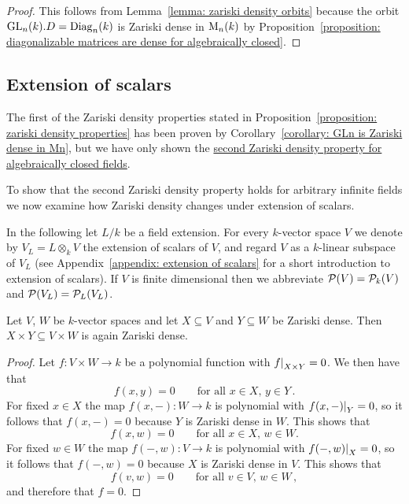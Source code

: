 \begin{proof}
  This follows from Lemma~\ref{lemma: zariski density orbits} because the orbit $\operatorname{GL}_n(k).D = \operatorname{Diag}_n(k)$ is Zariski dense in $\operatorname{M}_n(k)$ by Proposition~\ref{proposition: diagonalizable matrices are dense for algebraically closed}.
\end{proof}





\subsection*{Extension of scalars}


\begin{fluff}
  The first of the Zariski density properties stated in Proposition~\ref{proposition: zariski density properties} has been proven by Corollary~\ref{corollary: GLn is Zariski dense in Mn}, but we have only shown the \hyperref[corollary: second Zariski density property for algebraically closed fields]{second Zariski density property for algebraically closed fields}.
  
  To show that the second Zariski density property holds for arbitrary infinite fields we now examine how Zariski density changes under extension of scalars.
\end{fluff}


\begin{conventions}
  In the following let $L/k$ be a field extension.
  For every $k$-vector space $V$ we denote by $V_L = L \otimes_k V$ the extension of scalars of $V$, and regard $V$ as a $k$-linear subspace of $V_L$ (see Appendix~\ref{appendix: extension of scalars} for a short introduction to extension of scalars).
  If $V$ is finite dimensional then we abbreviate $\mathcal{P}(V) = \mathcal{P}_k(V)$ and $\mathcal{P}(V_L) = \mathcal{P}_L(V_L)$.
\end{conventions}


\begin{lemma}
  \label{lemma: product of Zariski dense is again Zariski dense}
  Let $V$, $W$ be $k$-vector spaces and let $X \subseteq V$ and $Y \subseteq W$ be Zariski dense.
  Then $X \times Y \subseteq V \times W$ is again Zariski dense.
\end{lemma}


\begin{proof}
  Let $f \colon V \times W \to k$ be a polynomial function with $\restrict{f}{X \times Y} = 0$.
  We then have that
  \[
      f(x,y)
    = 0
    \qquad
    \text{for all $x \in X$, $y \in Y$} \,.
  \]
  For fixed $x \in X$ the map $f(x,-) \colon W \to k$ is polynomial with $\restrict{f(x,-)}{Y} = 0$, so it follows that $f(x,-) = 0$ because $Y$ is Zariski dense in $W$.
  This shows that
  \[
      f(x,w)
    = 0
    \qquad
    \text{for all $x \in X$, $w \in W$}.
  \]
  For fixed $w \in W$ the map $f(-,w) \colon V \to k$ is polynomial with $\restrict{f(-,w)}{X} = 0$, so it follows that $f(-,w) = 0$ because $X$ is Zariski dense in $V$.
  This shows that
  \[
      f(v,w)
    = 0
    \qquad
    \text{for all $v \in V$, $w \in W$} \,,
  \]
  and therefore that $f = 0$.
\end{proof}



